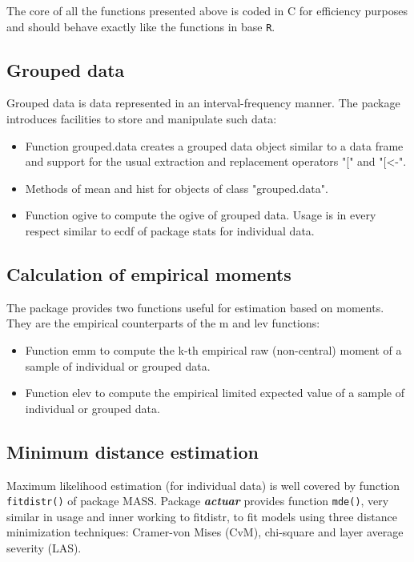 \documentclass[12pt]{article}
\begin{document}
The core of all the functions presented above is coded in C for efficiency purposes and should behave exactly like the functions in base \texttt{R}.

\subsection{Grouped data}

Grouped data is data represented in an interval-frequency manner. The package introduces facilities to store and manipulate such data:
\begin{itemize}
\item Function grouped.data creates a grouped data object similar to a data frame and support for the usual extraction and replacement operators "[" and "[<-".
\item Methods of mean and hist for objects of class "grouped.data".
\item Function ogive to compute the ogive of grouped data. Usage is in every respect similar to ecdf of package stats for individual data.
\end{itemize}

\subsection{Calculation of empirical moments}

The package provides two functions useful for estimation based on moments. They are the empirical counterparts of the m and lev functions:
\begin{itemize}
\item Function emm to compute the k-th empirical raw (non-central) moment of a sample of individual or grouped data.
\item Function elev to compute the empirical limited expected value of a sample of individual or grouped data.
\end{itemize}

\subsection{Minimum distance estimation}

Maximum likelihood estimation (for individual data) is well covered by function \texttt{fitdistr()} of package MASS. Package \textbf{\textit{actuar}} provides function \texttt{mde()}, very similar in usage and inner working to fitdistr, to fit models using three distance minimization techniques: Cramer-von Mises (CvM), chi-square and layer average severity (LAS).
\end{document}
